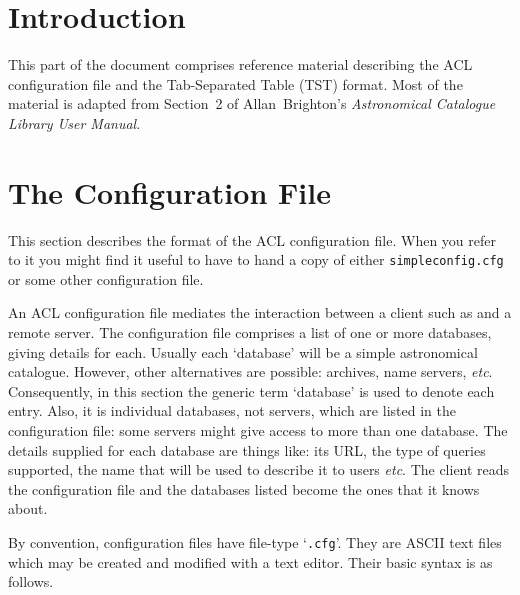 \documentclass[twoside,11pt,nolof,chapters]{starlink}
\begin{document}
\section{\label{INTRO_R}Introduction}

This part of the document comprises reference material describing
the ACL configuration file and the Tab-Separated Table (TST) format.
Most of the material is adapted from Section~2 of Allan~Brighton's \textit{Astronomical Catalogue Library User Manual}\/\cite{BRIGHTON98}.


\section{\label{CONFIG_R}The Configuration File}

This section describes the format of the ACL configuration file.  When
you refer to it you might find it useful to have to hand a copy of
either \texttt{simpleconfig.cfg} or some other configuration file.

An ACL configuration file mediates the interaction between
a client such as  and a remote server.
The configuration file comprises a list of one or more databases,
giving details for each.  Usually each `database' will be a simple
astronomical catalogue.  However, other alternatives are possible:
archives, name servers, \emph{etc}.  Consequently, in this section the
generic term `database' is used to denote each entry.  Also, it is
individual databases, not servers, which are listed in the configuration
file: some servers might give access to more than one database.
The details supplied for each database are things like: its URL, the
type of queries supported, the name that will be used to describe it to
users \emph{etc}.  The client reads the configuration file and the
databases listed become the ones that it knows about.

By convention, configuration files have file-type `\texttt{.cfg}'.
They are ASCII text files which may be created and modified with a text
editor.  Their basic syntax is as follows.
\end{document}
